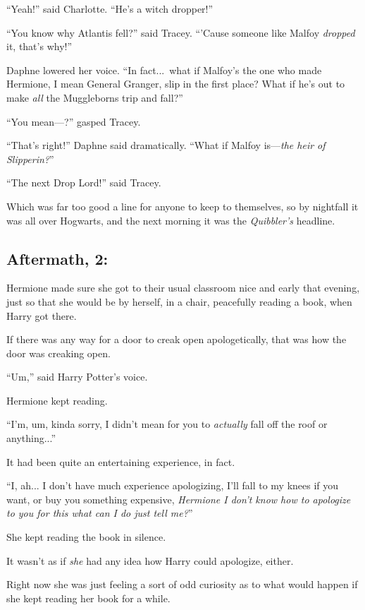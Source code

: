 “Yeah!” said Charlotte. “He’s a witch dropper!”

“You know why Atlantis fell?” said Tracey. “’Cause someone like Malfoy \emph{dropped} it, that’s why!”

Daphne lowered her voice. “In fact...\ what if Malfoy’s the one who made Hermione, I mean General Granger, slip in the first place? What if he’s out to make \emph{all} the Muggleborns trip and fall?”

“You mean—?” gasped Tracey.

“That’s right!” Daphne said dramatically. “What if Malfoy is—\emph{the heir of Slipperin?}”

“The next Drop Lord!” said Tracey.

Which was far too good a line for anyone to keep to themselves, so by nightfall it was all over Hogwarts, and the next morning it was the \emph{Quibbler’s} headline.
\replacement{\sbreak}{}

\subsection{Aftermath, 2:}

Hermione made sure she got to their usual classroom nice and early that evening, just so that she would be by herself, in a chair, peacefully reading a book, when Harry got there.

If there was any way for a door to creak open apologetically, that was how the door was creaking open.

“Um,” said Harry Potter’s voice.

Hermione kept reading.

“I’m, um, kinda sorry, I didn’t mean for you to \emph{actually} fall off the roof or anything...”

It had been quite an entertaining experience, in fact.

“I, ah... I don’t have much experience apologizing, I’ll fall to my knees if you want, or buy you something expensive, \emph{Hermione I don’t know how to apologize to you for this what can I do just tell me?}”

She kept reading the book in silence.

It wasn’t as if \emph{she} had any idea how Harry could apologize, either.

Right now she was just feeling a sort of odd curiosity as to what would happen if she kept reading her book for a while.
